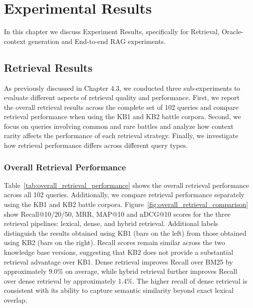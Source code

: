 \chapter{Experimental Results}
In this chapter we discuss Experiment Results, specifically for Retrieval, Oracle-context generation and End-to-end RAG experiments. 
\section{Retrieval Results}
As previously discussed in Chapter 4.3, we conducted three sub-experiments to evaluate different aspects of retrieval quality and performance. First, we report the overall retrieval results across the complete set of 102 queries and compare retrieval performance when using the KB1 and KB2 battle corpora. Second, we focus on queries involving common and rare battles and analyze how context rarity affects the performance of each retrieval strategy. Finally, we investigate how retrieval performance differs across different query types.
\subsection{Overall Retrieval Performance}
Table~\ref{tab:overall_retrieval_performance} shows the overall retrieval performance across all 102 queries. Additionally, we compare retrieval performance separately using the KB1 and KB2 battle corpora. Figure~\ref{fig:overall_retrieval_comparison} show Recall@10/20/50, MRR, MAP@10 and nDCG@10 scores for the three retrieval pipelines: lexical, dense, and hybrid retrieval. Additional labels distinguish the results obtained using KB1 (bars on the left) from those obtained using KB2 (bars on the right). Recall scores remain similar across the two knowledge base versions, suggesting that KB2 does not provide a substantial retrieval advantage over KB1. Dense retrieval improves Recall over BM25 by approximately 9.0\% on average, while hybrid retrieval further improves Recall over dense retrieval by approximately 1.4\%. The higher recall of dense retrieval is consistent with its ability to capture semantic similarity beyond exact lexical overlap. 

